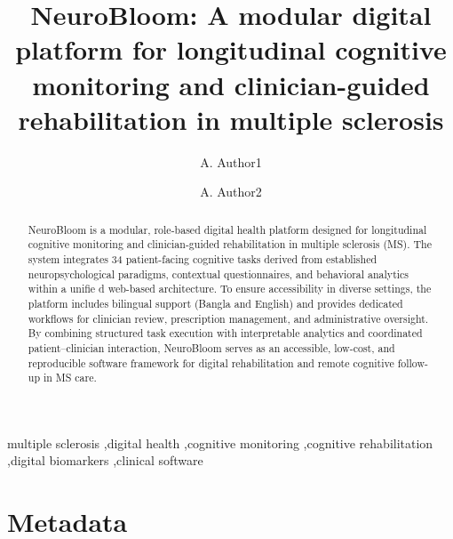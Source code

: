\documentclass[preprint,12pt,a4paper]{elsarticle}
\begin{document}
\begin{frontmatter}

\title{NeuroBloom: A modular digital platform for longitudinal cognitive monitoring and clinician-guided rehabilitation in multiple sclerosis}

\author[label1]{A. Author1}
\author[label2]{A. Author2}
\address[label1]{Author affiliation, address, email}
\address[label2]{Author affiliation, address, email}

\begin{abstract}
NeuroBloom is a modular, role-based digital health platform designed for longitudinal cognitive monitoring and clinician-guided rehabilitation in multiple sclerosis (MS). The system integrates 34 patient-facing cognitive tasks derived from established neuropsychological paradigms, contextual questionnaires, and behavioral analytics within a unifie d web-based architecture. To ensure accessibility in diverse settings, the platform includes bilingual support (Bangla and English) and provides dedicated workflows for clinician review, prescription management, and administrative oversight. By combining structured task execution with interpretable analytics and coordinated patient--clinician interaction, NeuroBloom serves as an accessible, low-cost, and reproducible software framework for digital rehabilitation and remote cognitive follow-up in MS care.
\end{abstract}

\begin{keyword}
multiple sclerosis \sep digital health \sep cognitive monitoring \sep cognitive rehabilitation \sep digital biomarkers \sep clinical software
\end{keyword}

\end{frontmatter}

\section*{Metadata}
\end{document}
